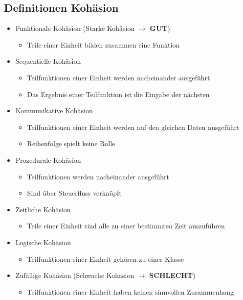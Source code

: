 \begin{multicols}{2}
\subsection{Definitionen Kohäsion}
\begin{itemize}
  \item Funktionale Kohäsion (Starke Kohäsion $\rightarrow$ \textbf{GUT})
  \begin{itemize}
    \item Teile einer Einheit bilden zusammen eine Funktion
  \end{itemize}
  \item Sequentielle Kohäsion
   \begin{itemize}
    \item Teilfunktionen einer Einheit werden nacheinander ausgeführt
    \item Das Ergebnis einer Teilfunktion ist die Eingabe der nächsten
  \end{itemize}
  \item Kommunikative Kohäsion
  \begin{itemize}
    \item Teilfunktionen einer Einheit werden auf den gleichen Daten ausgeführt
    \item Reihenfolge spielt keine Rolle
  \end{itemize}
  \item Prozedurale Kohäsion
  \begin{itemize}
    \item Teilfunktionen werden nacheinander ausgeführt
    \item Sind über Steuerfluss verknüpft
  \end{itemize}
  \item Zeitliche Kohäsion
  \begin{itemize}
    \item Teile einer Einheit sind alle zu einer bestimmten Zeit auszuführen
  \end{itemize}
  \item Logische Kohäsion
  \begin{itemize}
    \item Teilfunktionen einer Einheit gehören zu einer Klasse
  \end{itemize}
  \item Zufällige Kohäsion (Schwache Kohäsion $\rightarrow$ \textbf{SCHLECHT})
  \begin{itemize}
    \item Teilfunktionen einer Einheit haben keinen sinnvollen Zusammenhang
  \end{itemize}
\end{itemize}
\end{multicols}
